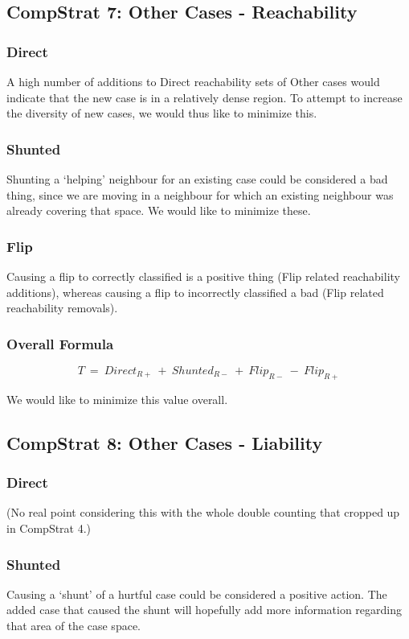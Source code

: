 \documentclass[a4paper,11pt]{report}
\begin{document}
\subsection{CompStrat 7: Other Cases - Reachability}
\subsubsection{Direct}
A high number of additions to Direct reachability sets of Other cases would indicate that the new case is in a relatively dense region. To attempt to increase the diversity of new cases, we would thus like to minimize this.

\subsubsection{Shunted}
Shunting a `helping' neighbour for an existing case could be considered a bad thing, since we are moving in a neighbour for which an existing neighbour was already covering that space. We would like to minimize these.

\subsubsection{Flip}
Causing a flip to correctly classified is a positive thing (Flip related reachability additions), whereas causing a flip to incorrectly classified a bad (Flip related reachability removals).

\subsubsection{Overall Formula}
\[  
  T~=~Direct_{R+}~+~Shunted_{R-}~+~Flip_{R-}~-~Flip_{R+}
\]

We would like to minimize this value overall.

\subsection{CompStrat 8: Other Cases - Liability}
\subsubsection{Direct}
(No real point considering this with the whole double counting that cropped up in CompStrat 4.)

\subsubsection{Shunted}
Causing a `shunt' of a hurtful case could be considered a positive action. The added case that caused the shunt will hopefully add more information regarding that area of the case space. 
\end{document}
